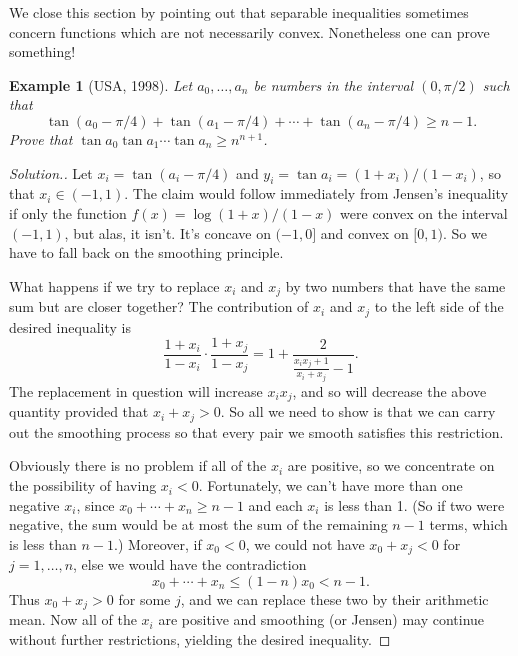 \documentclass[12pt]{report}
\newtheorem{problem}[theorem]{Example}
\numberwithin{exc}{section}
\begin{document}
We close this section by pointing out that separable inequalities 
sometimes concern functions which are not necessarily convex. 
Nonetheless one can prove something!

\begin{problem}[USA, 1998]
Let $a_0, \dots, a_n$ be numbers in the interval $(0, \pi/2)$ such that
\[
\tan (a_0 - \pi/4) + \tan (a_1 - \pi/4) + \cdots + \tan(a_n - \pi/4)
\geq n-1.
\]
Prove that $\tan a_0 \tan a_1 \cdots \tan a_n \geq n^{n+1}$.
\end{problem}
\begin{proof}[Solution.]
Let $x_i = \tan (a_i - \pi/4)$ and $y_i = \tan a_i = (1+x_i)/(1-x_i)$,
so that $x_i \in (-1,1)$. The claim would follow immediately from
Jensen's inequality if only the function $f(x) = \log(1+x)/(1-x)$
were convex on the interval $(-1,1)$, but alas, it isn't. It's 
concave on $(-1,0]$ and convex on $[0,1)$. So we have to fall back on
the smoothing principle.

What happens if we try to replace $x_i$ and $x_j$ by two numbers that have
the same sum but are closer together? The contribution of $x_i$ and $x_j$
to the left side of the desired inequality is
\[
\frac{1+x_i}{1-x_i} \cdot \frac{1+x_j}{1-x_j} = 1 + \frac{2}{\frac{x_ix_j+1}{x_i+x_j} - 1}.
\]
The replacement in question will increase $x_ix_j$, and so will decrease
the above quantity provided that $x_i + x_j > 0$. So all we need to show is that
we can carry out the smoothing process so that every pair we smooth satisfies
this restriction.

Obviously there is no problem if all of the $x_i$ are positive, so we concentrate
on the possibility of having $x_i < 0$.
Fortunately, we can't have more than one negative $x_i$, since
$x_0 + \cdots + x_n \geq n-1$ and each $x_i$ is less than 1. (So if two
were negative, the sum would be at most the sum of the remaining $n-1$
terms, which is less than $n-1$.) Moreover, if $x_0 < 0$, we could not have
$x_0 + x_j < 0$ for $j=1, \dots, n$, else we would have the contradiction
\[
x_0 + \cdots + x_n \leq (1-n)x_0 < n-1.
\]
Thus $x_0 + x_j > 0$ for some $j$, and we can replace these two by their
arithmetic mean. Now all of the $x_i$ are positive and smoothing (or Jensen)
may continue
without further restrictions, yielding the desired inequality.
\end{proof}
\end{document}
